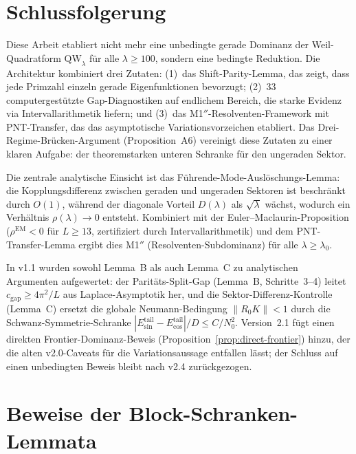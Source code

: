 ﻿\documentclass[12pt,a4paper]{article}
\theoremstyle{definition}
\theoremstyle{remark}
\begin{document}
\section{Schlussfolgerung}

Diese Arbeit etabliert nicht mehr eine unbedingte gerade Dominanz der Weil-Quadratform $\mathrm{QW}_\lambda$ für alle $\lambda \geq 100$, sondern eine bedingte Reduktion. Die Architektur kombiniert drei Zutaten: (1)~das Shift-Parity-Lemma, das zeigt, dass jede Primzahl einzeln gerade Eigenfunktionen bevorzugt; (2)~33 computergestützte Gap-Diagnostiken auf endlichem Bereich, die starke Evidenz via Intervallarithmetik liefern; und (3)~das M1$''$-Resolventen-Framework mit PNT-Transfer, das das asymptotische Variationsvorzeichen etabliert. Das Drei-Regime-Brücken-Argument (Proposition~A6) vereinigt diese Zutaten zu einer klaren Aufgabe: der theoremstarken unteren Schranke für den ungeraden Sektor.

Die zentrale analytische Einsicht ist das Führende-Mode-Auslöschungs-Lemma: die Kopplungsdifferenz zwischen geraden und ungeraden Sektoren ist beschränkt durch $O(1)$, während der diagonale Vorteil $D(\lambda)$ als $\sqrt{\lambda}$ wächst, wodurch ein Verhältnis $\rho(\lambda) \to 0$ entsteht. Kombiniert mit der Euler--Maclaurin-Proposition ($\rho^{\mathrm{EM}} < 0$ für $L \geq 13$, zertifiziert durch Intervallarithmetik) und dem PNT-Transfer-Lemma ergibt dies M1$''$ (Resolventen-Subdominanz) für alle $\lambda \geq \lambda_0$.

In v1.1 wurden sowohl Lemma~B als auch Lemma~C zu analytischen Argumenten aufgewertet: der Paritäts-Split-Gap (Lemma~B, Schritte~3--4) leitet $c_{\mathrm{gap}} \geq 4\pi^2/L$ aus Laplace-Asymptotik her, und die Sektor-Differenz-Kontrolle (Lemma~C) ersetzt die globale Neumann-Bedingung $\|R_0 K\| < 1$ durch die Schwanz-Symmetrie-Schranke $|E_{\sin}^{\mathrm{tail}} - E_{\cos}^{\mathrm{tail}}|/D \leq C/N_0^2$. Version~2.1 fügt einen direkten Frontier-Dominanz-Beweis (Proposition~\ref{prop:direct-frontier}) hinzu, der die alten v2.0-Caveats für die Variationsaussage entfallen lässt; der Schluss auf einen unbedingten Beweis bleibt nach v2.4 zurückgezogen.

\appendix
\section{Beweise der Block-Schranken-Lemmata}
\label{app:block-proofs}
\end{document}
